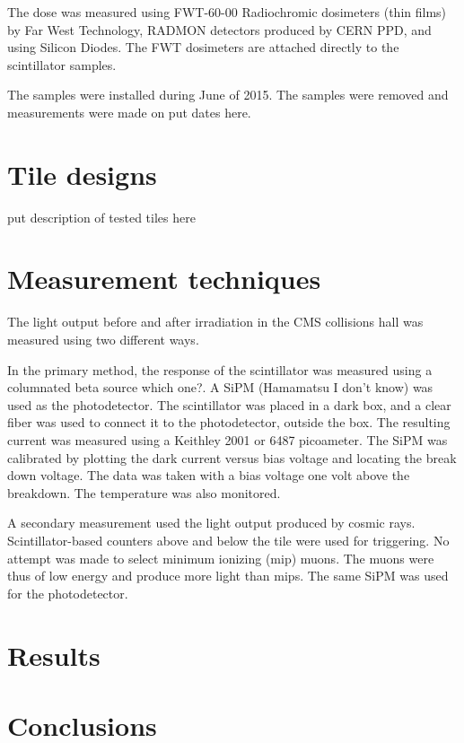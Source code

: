 \documentclass[review]{elsarticle}
\begin{document}
The dose was measured using FWT-60-00 Radiochromic dosimeters (thin films) by Far West Technology, RADMON detectors produced by CERN PPD,  and using Silicon Diodes.  The FWT dosimeters are attached directly to the scintillator samples.


The samples were installed during June of 2015.  The samples were removed
and measurements were made on {\color{red} put dates here}.

\section{Tile designs}
\label{sec:design}

{\color{red} put description of tested tiles here}


\section{Measurement techniques}
\label{sec:techniques}

The light output before and after irradiation in the CMS collisions hall
was measured using two different ways.

In the primary method, the response
of the scintillator was measured 
using a columnated beta source {\color{red} which one?}.
A SiPM (Hamamatsu {\color{red} I don't know}) was used as the photodetector.
The scintillator was placed in a dark box, and a clear fiber was used
to connect it to the photodetector, outside the box.
The resulting current was measured using a Keithley 2001 or 6487 picoameter.
The SiPM was calibrated by plotting the dark current versus bias voltage and locating the break down voltage.  The data was taken with a bias voltage one volt above the breakdown.   The temperature was also monitored.

A secondary measurement used the
light output produced by cosmic rays.
Scintillator-based counters above and below the tile were used for triggering.
  No attempt was made to select minimum ionizing (mip) muons.  The muons were thus
  of low energy and produce more light than mips.
  The same SiPM was used for the photodetector.  

\section{Results}
\label{sec:Results}


\section{Conclusions}
\label{sec:Conclusions}
\end{document}
